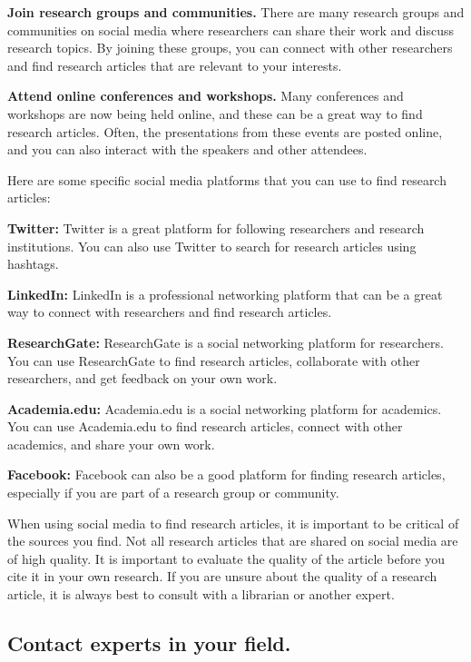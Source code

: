 \documentclass[
]{book}
\begin{document}
\textbf{Join research groups and communities.} There are many research groups and communities on social media where researchers can share their work and discuss research topics. By joining these groups, you can connect with other researchers and find research articles that are relevant to your interests.

\textbf{Attend online conferences and workshops.} Many conferences and workshops are now being held online, and these can be a great way to find research articles. Often, the presentations from these events are posted online, and you can also interact with the speakers and other attendees.

Here are some specific social media platforms that you can use to find research articles:

\textbf{Twitter:} Twitter is a great platform for following researchers and research institutions. You can also use Twitter to search for research articles using hashtags.

\textbf{LinkedIn:} LinkedIn is a professional networking platform that can be a great way to connect with researchers and find research articles.

\textbf{ResearchGate:} ResearchGate is a social networking platform for researchers. You can use ResearchGate to find research articles, collaborate with other researchers, and get feedback on your own work.

\textbf{Academia.edu:} Academia.edu is a social networking platform for academics. You can use Academia.edu to find research articles, connect with other academics, and share your own work.

\textbf{Facebook:} Facebook can also be a good platform for finding research articles, especially if you are part of a research group or community.

When using social media to find research articles, it is important to be critical of the sources you find. Not all research articles that are shared on social media are of high quality. It is important to evaluate the quality of the article before you cite it in your own research. If you are unsure about the quality of a research article, it is always best to consult with a librarian or another expert.

\subsection*{Contact experts in your field.}\label{contact-experts-in-your-field.}
\end{document}
